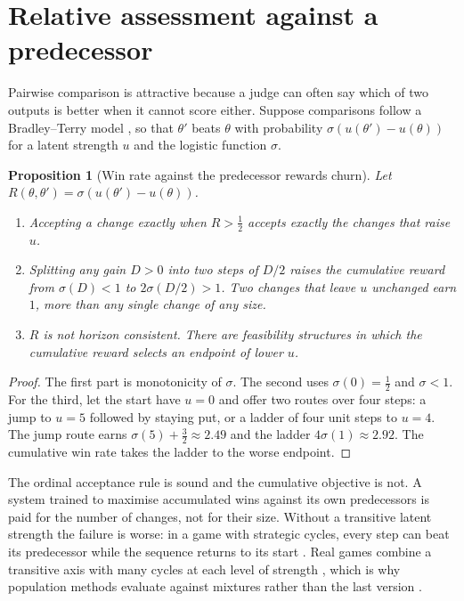\documentclass[11pt]{article}
\newtheorem{proposition}{Proposition}
\theoremstyle{definition}
\theoremstyle{remark}
\begin{document}
\section{Relative assessment against a predecessor}

Pairwise comparison is attractive because a judge can often say which of two outputs is better
when it cannot score either. Suppose comparisons follow a Bradley--Terry model
\citep{bradley1952rank}, so that $\theta'$ beats $\theta$ with probability
$\sigma(u(\theta')-u(\theta))$ for a latent strength $u$ and the logistic function $\sigma$.

\begin{proposition}[Win rate against the predecessor rewards churn]\label{prop:churn}
Let $R(\theta,\theta')=\sigma(u(\theta')-u(\theta))$.
\begin{enumerate}
\item Accepting a change exactly when $R>\tfrac12$ accepts exactly the changes that raise $u$.
\item Splitting any gain $D>0$ into two steps of $D/2$ raises the cumulative reward from
$\sigma(D)<1$ to $2\sigma(D/2)>1$. Two changes that leave $u$ unchanged earn $1$, more than any
single change of any size.
\item $R$ is not horizon consistent. There are feasibility structures in which the cumulative
reward selects an endpoint of lower $u$.
\end{enumerate}
\end{proposition}

\begin{proof}
The first part is monotonicity of $\sigma$. The second uses $\sigma(0)=\tfrac12$ and
$\sigma<1$. For the third, let the start have $u=0$ and offer two routes over four steps: a jump
to $u=5$ followed by staying put, or a ladder of four unit steps to $u=4$. The jump route earns
$\sigma(5)+\tfrac32\approx 2.49$ and the ladder $4\sigma(1)\approx 2.92$. The cumulative win
rate takes the ladder to the worse endpoint.
\end{proof}

The ordinal acceptance rule is sound and the cumulative objective is not. A system trained to
maximise accumulated wins against its own predecessors is paid for the number of changes, not
for their size. Without a transitive latent strength the failure is worse: in a game with
strategic cycles, every step can beat its predecessor while the sequence returns to its start
\citep{balduzzi2019openended}. Real games combine a transitive axis with many cycles at each
level of strength \citep{czarnecki2020spinning}, which is why population methods evaluate
against mixtures rather than the last version
\citep{lanctot2017unified,balduzzi2018reevaluating}.
\end{document}
